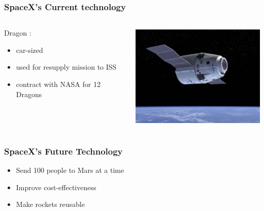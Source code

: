 {\begin{frame}
    \frametitle{SpaceX's Current technology}
    \begin{columns}
        \begin{column}{50mm}
            Dragon :\\
            \vspace{1em}
            \begin{itemize}
                \item car-sized
                \item used for resupply mission to ISS
                \item contract with NASA for 12 Dragons
            \end{itemize}
        \end{column}
        \begin{column}{65mm}
\includegraphics[height=50mm]{images/dragon}
        \end{column}
    \end{columns}
\end{frame}
}

\begin{frame}
    \frametitle{SpaceX's Future Technology}
    \begin{itemize}
        \item Send 100 people to Mars at a time
        \item Improve cost-effectiveness
        \item Make rockets reusable
    \end{itemize}

\end{frame}

